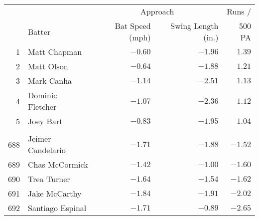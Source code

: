 \begin{tabular}{rl|rr|r}
& & \multicolumn{2}{c|}{Approach} & Runs /\\
 & Batter & Bat Speed (mph) & Swing Length (in.) & 500 PA \\
  \hline
  1 & Matt Chapman & $-0.60$ & $-1.96$ & $1.39$ \\ 
    2 & Matt Olson & $-0.64$ & $-1.88$ & $1.21$ \\ 
    3 & Mark Canha & $-1.14$ & $-2.51$ & $1.13$ \\ 
    4 & Dominic Fletcher & $-1.07$ & $-2.36$ & $1.12$ \\ 
    5 & Joey Bart & $-0.83$ & $-1.95$ & $1.04$ \\ 
   &  &  &  &  \\ 
  688 & Jeimer Candelario & $-1.71$ & $-1.88$ & $-1.52$ \\ 
  689 & Chas McCormick & $-1.42$ & $-1.00$ & $-1.60$ \\ 
  690 & Trea Turner & $-1.64$ & $-1.54$ & $-1.62$ \\ 
  691 & Jake McCarthy & $-1.84$ & $-1.91$ & $-2.02$ \\ 
  692 & Santiago Espinal & $-1.71$ & $-0.89$ & $-2.65$ \\ 
\end{tabular}
